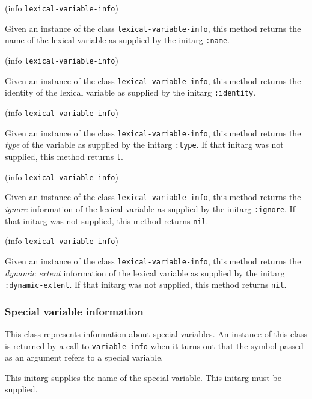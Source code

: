  {(info {\tt lexical-variable-info})}

Given an instance of the class \texttt{lexical-variable-info}, this
method returns the name of the lexical variable as supplied by the
initarg \texttt{:name}.

 {(info {\tt lexical-variable-info})}

Given an instance of the class \texttt{lexical-variable-info}, this
method returns the identity of the lexical variable as supplied by the
initarg \texttt{:identity}.

 {(info {\tt lexical-variable-info})}

Given an instance of the class \texttt{lexical-variable-info}, this
method returns the \emph{type} of the variable as supplied by the
initarg \texttt{:type}.  If that initarg was not supplied, this method
returns \texttt{t}.

 {(info {\tt lexical-variable-info})}

Given an instance of the class \texttt{lexical-variable-info}, this
method returns the \emph{ignore} information of the lexical variable as
supplied by the initarg \texttt{:ignore}.  If that initarg was not
supplied, this method returns \texttt{nil}.

 {(info {\tt lexical-variable-info})}

Given an instance of the class \texttt{lexical-variable-info}, this
method returns the \emph{dynamic extent} information of the lexical
variable as supplied by the initarg \texttt{:dynamic-extent}.  If that
initarg was not supplied, this method returns \texttt{nil}.

\subsubsection{Special variable information}


This class represents information about special variables.   An
instance of this class is returned by a call to \texttt{variable-info}
when it turns out that the symbol passed as an argument refers to a
special variable.



This initarg supplies the name of the special variable.  This initarg
must be supplied. 


